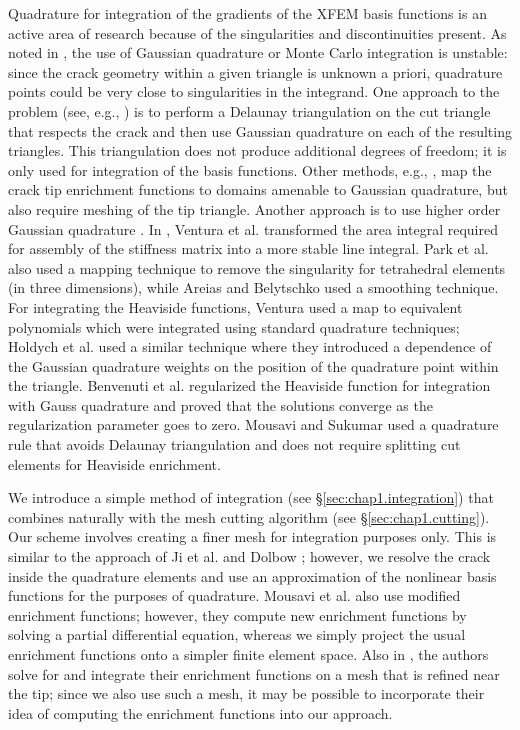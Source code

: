 Quadrature for integration of the gradients of the XFEM basis functions is an active area of research because of the singularities and discontinuities present. As noted in \cite{Daux00}, the use of Gaussian quadrature or Monte Carlo integration is unstable: since the crack geometry within a given triangle is unknown a priori, quadrature points could be very close to singularities in the integrand. One approach to the problem (see, e.g., \cite{Stazi03}) is to perform a Delaunay triangulation on the cut triangle that respects the crack and then use Gaussian quadrature on each of the resulting triangles. This triangulation does not produce additional degrees of freedom; it is only used for integration of the basis functions. Other methods, e.g., \cite{Bechet05, Laborde05}, map the crack tip enrichment functions to domains amenable to Gaussian quadrature, but also require meshing of the tip triangle. Another approach is to use higher order Gaussian quadrature \cite{Strouboulis00}. In \cite{Ventura09}, Ventura et al. transformed the area integral required for assembly of the stiffness matrix into a more stable line integral. Park et al. \cite{Park09} also used a mapping technique to remove the singularity for tetrahedral elements (in three dimensions), while Areias and Belytschko \cite{Areias05} used a smoothing technique. For integrating the Heaviside functions, Ventura \cite{Ventura06} used a map to equivalent polynomials which were integrated using standard quadrature techniques; Holdych et al. \cite{Holdych08} used a similar technique where they introduced a dependence of the Gaussian quadrature weights on the position of the quadrature point within the triangle. Benvenuti et al. \cite{Benvenuti08} regularized the Heaviside function for integration with Gauss quadrature and proved that the solutions converge as the regularization parameter goes to zero. Mousavi and Sukumar \cite{Mousavi10} used a quadrature rule that avoids Delaunay triangulation and does not require splitting cut elements for Heaviside enrichment. 

We introduce a simple method of integration (see \S\ref{sec:chap1.integration}) that combines naturally with the mesh cutting algorithm (see \S\ref{sec:chap1.cutting}). Our scheme involves creating a finer mesh for integration purposes only. This is similar to the approach of Ji et al. \cite{Ji.H02} and Dolbow \cite{Dolbow99}; however, we resolve the crack inside the quadrature elements and use an approximation of the nonlinear basis functions for the purposes of quadrature. Mousavi et al. \cite{Mousavi11} also use modified enrichment functions; however, they compute new enrichment functions by solving a partial differential equation, whereas we simply project the usual enrichment functions onto a simpler finite element space. Also in \cite{Mousavi11}, the authors solve for and integrate their enrichment functions on a mesh that is refined near the tip; since we also use such a mesh, it may be possible to incorporate their idea of computing the enrichment functions into our approach.

